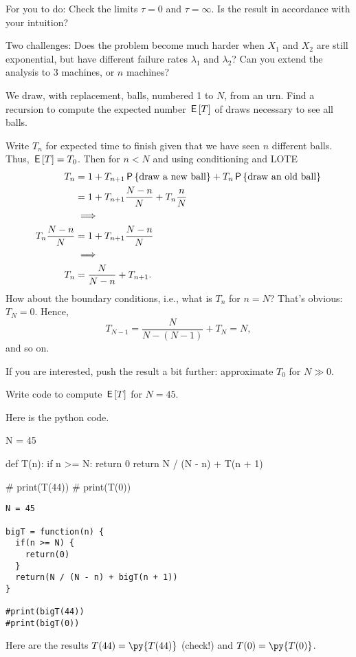 \documentclass[lectures]{subfiles}
\begin{document}
\begin{exercise}
\begin{solution}
For you to do: Check the limits $\tau=0$ and $\tau=\infty$. Is the result in accordance with your intuition?

Two challenges: Does the problem become much harder when $X_{1}$ and $X_{2}$ are still exponential, but have different failure rates $\lambda_1$ and $\lambda_{2}$? Can you extend the analysis to 3 machines, or $n$ machines?

\end{solution}
\end{exercise}

\begin{exercise}
We draw, with replacement, balls, numbered 1 to $N$, from an urn.
Find a recursion to compute the expected number $\E T$ of draws necessary to see all balls.
\begin{solution}
Write $T_{n}$ for expected time to finish given that we have seen $n$ different balls. Thus, $\E T = T_{0}$.
Then for $n< N$ and using conditioning and LOTE
\begin{align}
T_n
&= 1
+T_{n+1} \P{\text{draw a new ball}}
+T_{n} \P{\text{draw an old ball}}  \\
&= 1
+T_{n+1} \frac{N-n}{N}
+T_{n} \frac{n}{N} \\
&\implies\\
T_n \frac{N-n}{N} &= 1 +T_{n+1} \frac{N-n}{N} \\
&\implies \\
T_n &= \frac{N}{N-n}  +T_{n+1}.
\end{align}
How about the boundary conditions, i.e., what is $T_{n}$ for $n=N$?
That's obvious: $T_{N} = 0$. Hence,
\begin{equation}
T_{N-1} = \frac{N}{N-(N-1)} + T_{N} = N,
\end{equation}
and so on.

If you are interested,  push the result a bit further: approximate $T_{0}$ for $N\gg 0$.
\end{solution}
\end{exercise}


\begin{exercise}
Write code to compute $\E T$ for $N=45$.
\begin{solution}
Here is the python code.

\begin{pyblock}
N = 45


def T(n):
    if n >= N:
        return 0
    return N / (N - n) + T(n + 1)

# print(T(44))
# print(T(0))
\end{pyblock}
\begin{verbatim}
N = 45

bigT = function(n) {
  if(n >= N) {
    return(0)
  }
  return(N / (N - n) + bigT(n + 1))
}

#print(bigT(44))
#print(bigT(0))
\end{verbatim}
Here are the results $T(44) = \py{T(44)}$ (check!) and $T(0) = \py{T(0)}$.
\end{solution}
\end{exercise}
\end{document}
